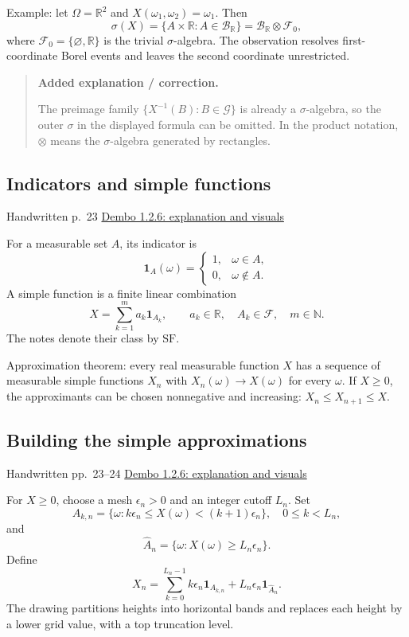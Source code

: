 \documentclass[11pt,letterpaper]{article}
\newcommand{\lecturesection}[1]{\subsection{#1}}
\begin{document}
Example: let $\Omega=\mathbb R^2$ and $X(\omega_1,\omega_2)=\omega_1$. Then \[\sigma(X)=\{A\times\mathbb R:A\in\mathcal B_{\mathbb R}\}=\mathcal B_{\mathbb R}\otimes\mathcal F_0,\] where $\mathcal F_0=\{\varnothing,\mathbb R\}$ is the trivial $\sigma$-algebra. The observation resolves first-coordinate Borel events and leaves the second coordinate unrestricted.

\begin{quote}\small\textbf{Added explanation / correction.}

The preimage family $\{X^{-1}(B):B\in\mathcal G\}$ is already a $\sigma$-algebra, so the outer $\sigma$ in the displayed formula can be omitted. In the product notation, $\otimes$ means the $\sigma$-algebra generated by rectangles.
\end{quote}

\hypertarget{l3-s4}{}
\lecturesection{Indicators and simple functions}
{\small\textcolor{lectureink}{Handwritten p.\ 23} \quad \href{https://josephrbailey.com/probability/\#entry-1-2-6}{Dembo 1.2.6: explanation and visuals}}

For a measurable set $A$, its indicator is \[\mathbf1_A(\omega)=\begin{cases}1,&\omega\in A,\\0,&\omega\notin A.\end{cases}\] A simple function is a finite linear combination \[X=\sum_{k=1}^{m}a_k\mathbf1_{A_k},\qquad a_k\in\mathbb R,\quad A_k\in\mathcal F,\quad m\in\mathbb N.\] The notes denote their class by $\mathrm{SF}$.

Approximation theorem: every real measurable function $X$ has a sequence of measurable simple functions $X_n$ with $X_n(\omega)\to X(\omega)$ for every $\omega$. If $X\ge0$, the approximants can be chosen nonnegative and increasing: $X_n\le X_{n+1}\le X$.

\hypertarget{l3-s5}{}
\lecturesection{Building the simple approximations}
{\small\textcolor{lectureink}{Handwritten pp.\ 23--24} \quad \href{https://josephrbailey.com/probability/\#entry-1-2-6}{Dembo 1.2.6: explanation and visuals}}

For $X\ge0$, choose a mesh $\epsilon_n>0$ and an integer cutoff $L_n$. Set \[A_{k,n}=\{\omega:k\epsilon_n\le X(\omega)<(k+1)\epsilon_n\},\quad 0\le k<L_n,\] and \[\widehat A_n=\{\omega:X(\omega)\ge L_n\epsilon_n\}.\] Define \[X_n=\sum_{k=0}^{L_n-1}k\epsilon_n\mathbf1_{A_{k,n}}+L_n\epsilon_n\mathbf1_{\widehat A_n}.\] The drawing partitions heights into horizontal bands and replaces each height by a lower grid value, with a top truncation level.
\end{document}
